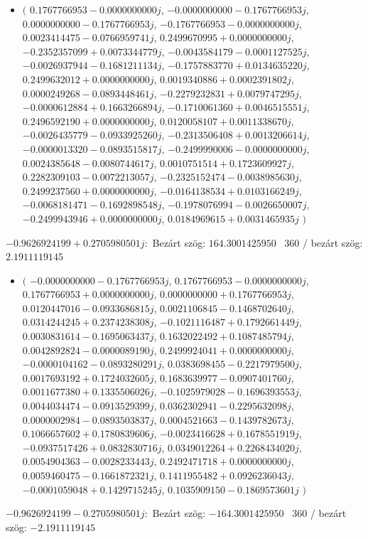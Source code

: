\documentclass[14pt,a4paper]{article}
\begin{document}
\begin{itemize}
\item
$\big($
$0.1767766953-0.0000000000j$, $-0.0000000000-0.1767766953j$, $0.0000000000-0.1767766953j$, $-0.1767766953-0.0000000000j$, $0.0023414475-0.0766959741j$, $0.2499670995+0.0000000000j$, $-0.2352357099+0.0073344779j$, $-0.0043584179-0.0001127525j$, $-0.0026937944-0.1681211134j$, $-0.1757883770+0.0134635220j$, $0.2499632012+0.0000000000j$, $0.0019340886+0.0002391802j$, $0.0000249268-0.0893448461j$, $-0.2279232831+0.0079747295j$, $-0.0000612884+0.1663266894j$, $-0.1710061360+0.0046515551j$, $0.2496592190+0.0000000000j$, $0.0120058107+0.0011338670j$, $-0.0026435779-0.0933925260j$, $-0.2313506408+0.0013206614j$, $-0.0000013320-0.0893515817j$, $-0.2499990006-0.0000000000j$, $0.0024385648-0.0080744617j$, $0.0010751514+0.1723609927j$, $0.2282309103-0.0072213057j$, $-0.2325152474-0.0038985630j$, $0.2499237560+0.0000000000j$, $-0.0164138534+0.0103166249j$, $-0.0068181471-0.1692898548j$, $-0.1978076994-0.0026650007j$, $-0.2499943946+0.0000000000j$, $0.0184969615+0.0031465935j$
$\big)$
\end{itemize}
$-0.9626924199+0.2705980501j$:\
Bezárt szög: $164.3001425950$ \
360 / bezárt szög: $2.1911119145$\
\begin{itemize}
\item
$\big($
$-0.0000000000-0.1767766953j$, $0.1767766953-0.0000000000j$, $0.1767766953+0.0000000000j$, $0.0000000000+0.1767766953j$, $0.0120447016-0.0933686815j$, $0.0021106845-0.1468702640j$, $0.0314244245+0.2374238308j$, $-0.1021116487+0.1792661449j$, $0.0030831614-0.1695063437j$, $0.1632022492+0.1087485794j$, $0.0042892824-0.0000089190j$, $0.2499924041+0.0000000000j$, $-0.0000104162-0.0893280291j$, $0.0383698455-0.2217979500j$, $0.0017693192+0.1724032605j$, $0.1683639977-0.0907401760j$, $0.0011677380+0.1335506026j$, $-0.1025979028-0.1696393553j$, $0.0044034474-0.0913529399j$, $0.0362302941-0.2295632098j$, $0.0000002984-0.0893503837j$, $0.0004521663-0.1439782673j$, $0.1066657602+0.1780839606j$, $-0.0023416628+0.1678551919j$, $-0.0937517426+0.0832830716j$, $0.0349012264+0.2268434020j$, $0.0054904363-0.0028233443j$, $0.2492471718+0.0000000000j$, $0.0059460475-0.1661872321j$, $0.1411955482+0.0926236043j$, $-0.0001059048+0.1429715245j$, $0.1035909150-0.1869573601j$
$\big)$
\end{itemize}
$-0.9626924199-0.2705980501j$:\
Bezárt szög: $-164.3001425950$ \
360 / bezárt szög: $-2.1911119145$\
\end{document}
